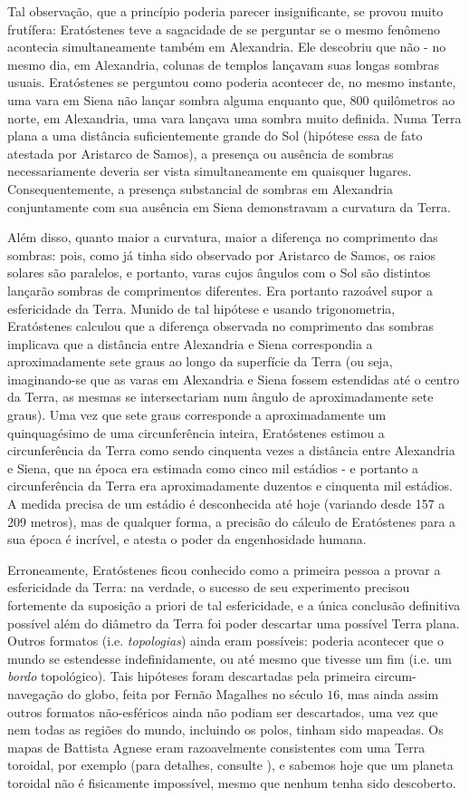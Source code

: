Tal observação, que a princípio poderia parecer insignificante, se provou muito frutífera: Eratóstenes teve a sagacidade de se perguntar se o mesmo fenômeno acontecia simultaneamente também em Alexandria. Ele descobriu que não - no mesmo dia, em Alexandria, colunas de templos lançavam suas longas sombras usuais. Eratóstenes se perguntou como poderia acontecer de, no mesmo instante, uma vara em Siena não lançar sombra alguma enquanto que, 800 quilômetros ao norte, em Alexandria, uma vara lançava uma sombra muito definida. Numa Terra plana a uma distância suficientemente grande do Sol (hipótese essa de fato atestada por Aristarco de Samos), a presença ou ausência de sombras necessariamente deveria ser vista simultaneamente em quaisquer lugares. Consequentemente, a presença substancial de sombras em Alexandria conjuntamente com sua ausência em Siena demonstravam a curvatura da Terra. \par 
Além disso, quanto maior a curvatura, maior a diferença no comprimento das sombras: pois, como já tinha sido observado por Aristarco de Samos, os raios solares são paralelos, e portanto, varas cujos ângulos com o Sol são distintos lançarão sombras de comprimentos diferentes. Era portanto razoável supor a esfericidade da Terra. Munido de tal hipótese e usando trigonometria, Eratóstenes calculou que a diferença observada no comprimento das sombras implicava que a distância entre Alexandria e Siena correspondia a aproximadamente sete graus ao longo da superfície da Terra (ou seja, imaginando-se que as varas em Alexandria e Siena fossem estendidas até o centro da Terra, as mesmas se intersectariam num ângulo de aproximadamente sete graus). Uma vez que sete graus corresponde a aproximadamente um quinquagésimo de uma circunferência inteira, Eratóstenes estimou a circunferência da Terra como sendo cinquenta vezes a distância entre Alexandria e Siena, que na época era estimada como cinco mil estádios - e portanto a circunferência da Terra era aproximadamente duzentos e cinquenta mil estádios. A medida precisa de um estádio é desconhecida até hoje (variando desde 157 a 209 metros), mas de qualquer forma, a precisão do cálculo de Eratóstenes para a sua época é incrível, e atesta o poder da engenhosidade humana. \par 
Erroneamente, Eratóstenes ficou conhecido como a primeira pessoa a provar a esfericidade da Terra: na verdade, o sucesso de seu experimento precisou fortemente da suposição a priori de tal esfericidade, e a única conclusão definitiva possível além do diâmetro da Terra foi poder descartar uma possível Terra plana. Outros formatos (i.e. \emph{topologias}) ainda eram possíveis: poderia acontecer que o  mundo se estendesse indefinidamente, ou até mesmo que tivesse um fim (i.e. um \emph{bordo} topológico). Tais hipóteses foram descartadas pela primeira circum-navegação do globo, feita por Fernão Magalhes no século $16$, mas ainda assim outros formatos não-esféricos ainda não podiam ser descartados, uma vez que nem todas as regiões do mundo, incluindo os polos, tinham sido mapeadas. Os mapas de Battista Agnese eram razoavelmente consistentes com uma Terra toroidal, por exemplo (para detalhes, consulte ), e sabemos hoje que um planeta toroidal não é fisicamente impossível, mesmo que nenhum tenha sido descoberto. \par 
